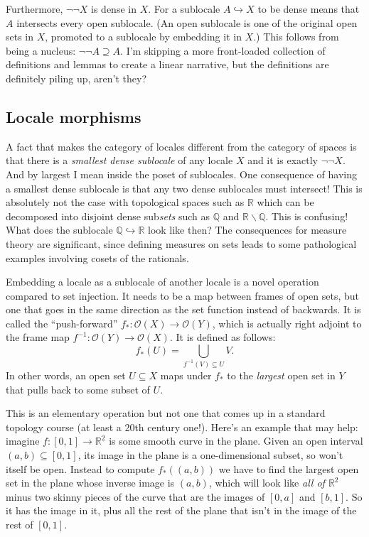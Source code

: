 \documentclass[12pt]{extarticle}
\renewcommand{\o}{\ensuremath{\mathcal{O}}}
\begin{document}
Furthermore, $\neg\neg X$ is dense in $X$. For a sublocale $A\hookrightarrow X$ to be dense means that $A$ intersects every open sublocale. (An open sublocale is one of the original open sets in $X$, promoted to a sublocale by embedding it in $X$.) This follows from being a nucleus: $\neg\neg A \supseteq A$. I'm skipping a more front-loaded collection of definitions and lemmas to create a linear narrative, but the definitions are definitely piling up, aren't they?

\subsection{Locale morphisms}

A fact that makes the category of locales different from the category of spaces is that there is a \emph{smallest dense sublocale} of any locale $X$ and it is exactly $\neg\neg X$. And by largest I mean inside the poset of sublocales. One consequence of having a smallest dense sublocale is that any two dense sublocales must intersect! This is absolutely not the case with topological spaces such as $\mathbb{R}$ which can be decomposed into disjoint dense sub\emph{sets} such as $\mathbb{Q}$ and $\mathbb{R}\backslash\mathbb{Q}$. This is confusing! What does the sublocale $\mathbb{Q}\hookrightarrow\mathbb{R}$ look like then? The consequences for measure theory are significant, since defining measures on sets leads to some pathological examples involving cosets of the rationals.

Embedding a locale as a sublocale of another locale is a novel operation compared to set injection. It needs to be a map between frames of open sets, but one that goes in the same direction as the set function instead of backwards. It is called the ``push-forward'' $f_*:\o(X)\to\o(Y)$, which is actually right adjoint to the frame map $f^{-1}:\o(Y)\to\o(X)$. It is defined as follows: $$f_*(U)=\bigcup_{f^{-1}(V)\subseteq U}V.$$ In other words, an open set $U\subseteq X$ maps under $f_*$ to the \emph{largest} open set in $Y$ that pulls back to some subset of $U$.

This is an elementary operation but not one that comes up in a standard topology course (at least a 20th century one!). Here's an example that may help: imagine $f:[0,1]\to\mathbb{R}^2$ is some smooth curve in the plane. Given an open interval $(a,b)\subseteq[0,1]$, its image in the plane is a one-dimensional subset, so won't itself be open. Instead to compute $f_*((a,b))$ we have to find the largest open set in the plane whose inverse image is $(a,b)$, which will look like \emph{all of $\mathbb{R}^2$} minus two skinny pieces of the curve that are the images of $[0,a]$ and $[b,1]$. So it has the image in it, plus all the rest of the plane that isn't in the image of the rest of $[0,1]$.
\end{document}
